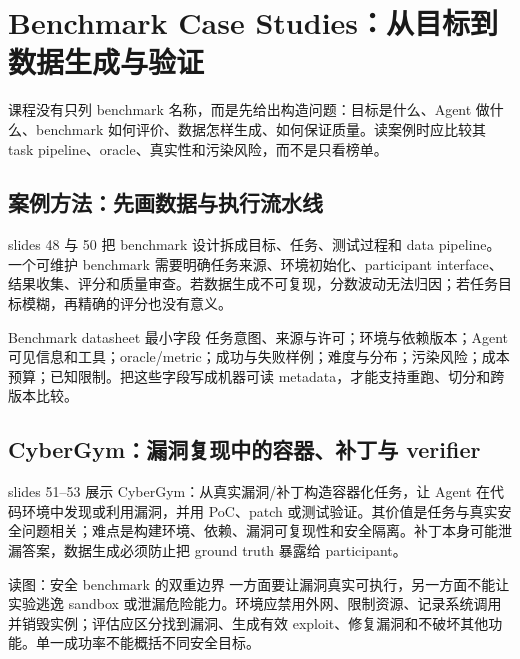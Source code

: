 \section{Benchmark Case Studies：从目标到数据生成与验证}

课程没有只列 benchmark 名称，而是先给出构造问题：目标是什么、Agent 做什么、benchmark 如何评价、数据怎样生成、如何保证质量。读案例时应比较其 task pipeline、oracle、真实性和污染风险，而不是只看榜单。

\subsection{案例方法：先画数据与执行流水线}

slides 48 与 50 把 benchmark 设计拆成目标、任务、测试过程和 data pipeline。一个可维护 benchmark 需要明确任务来源、环境初始化、participant interface、结果收集、评分和质量审查。若数据生成不可复现，分数波动无法归因；若任务目标模糊，再精确的评分也没有意义。


\begin{importantbox}{Benchmark datasheet 最小字段}
任务意图、来源与许可；环境与依赖版本；Agent 可见信息和工具；oracle/metric；成功与失败样例；难度与分布；污染风险；成本预算；已知限制。把这些字段写成机器可读 metadata，才能支持重跑、切分和跨版本比较。
\end{importantbox}

\subsection{CyberGym：漏洞复现中的容器、补丁与 verifier}

slides 51--53 展示 CyberGym：从真实漏洞/补丁构造容器化任务，让 Agent 在代码环境中发现或利用漏洞，并用 PoC、patch 或测试验证。其价值是任务与真实安全问题相关；难点是构建环境、依赖、漏洞可复现性和安全隔离。补丁本身可能泄漏答案，数据生成必须防止把 ground truth 暴露给 participant。


\begin{knowledgebox}{读图：安全 benchmark 的双重边界}
一方面要让漏洞真实可执行，另一方面不能让实验逃逸 sandbox 或泄漏危险能力。环境应禁用外网、限制资源、记录系统调用并销毁实例；评估应区分找到漏洞、生成有效 exploit、修复漏洞和不破坏其他功能。单一成功率不能概括不同安全目标。
\end{knowledgebox}

